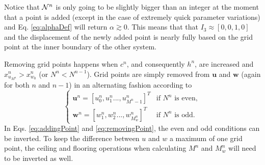 Notice that $\mathcal{N}^n$ is only going to be slightly bigger than an integer at the moment that a point is added (except in the case of extremely quick parameter variations) and Eq. \eqref{eq:alphaDef} will return $\alpha \gtrsim 0$.
This means that that $I_3 \approx [0, 0, 1, 0]$ and the displacement of the newly added point is nearly fully based on the grid point at the inner boundary of the other system. %

Removing grid points happens when $c^n$, and consequently $h^n$, are increased and $x_{u_{M^n}}^n > x_{w_0}^n$ (or $ N^n <  N^{n-1}$). %
Grid points are simply removed from $\mathbf{u}$ and $\mathbf{w}$ (again for both $n$ and $n-1$) in an alternating fashion according to
\begin{equation}\label{eq:removingPoint}
\begin{cases}
    \mathbf{u}^n = [u_0^n, u_1^n ..., u_{M^n-1}^n]^T & \text{if $N^n$ is even}, \\
     \mathbf{w}^n = [w_1^n, w_2^n ..., w_{M_w^n}^n]^T & \text{if $N^n$ is odd}.
    \end{cases}
\end{equation}
In Eqs. \eqref{eq:addingPoint} and \eqref{eq:removingPoint}, the even and odd conditions can be inverted. To keep the difference between $u$ and $w$ a maximum of one grid point, the ceiling and flooring operations when calculating $M^n$ and $M_w^n$ will need to be inverted as well.

